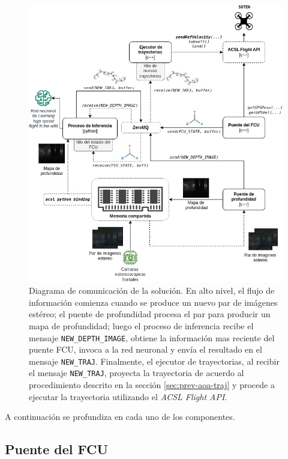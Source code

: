 \begin{figure}[H]
    \centering
    \includegraphics[scale=0.5]{partes/img/Solution-V3-Spanish.jpg}
    \caption[Diagrama de comunicación de la solución.]{Diagrama de comunicación de la solución. En alto nivel, el flujo de información comienza cuando se produce un nuevo par de imágenes estéreo; el puente de profundidad procesa el par para producir un mapa de profundidad; luego el proceso de inferencia recibe el mensaje \texttt{NEW\_DEPTH\_IMAGE}, obtiene la información mas reciente del puente FCU, invoca a la red neuronal y envía el resultado en el mensaje \texttt{NEW\_TRAJ}. Finalmente, el ejecutor de trayectorias, al recibir el mensaje \texttt{NEW\_TRAJ}, proyecta la trayectoria de acuerdo al procedimiento descrito en la sección \ref{sec:prev-aoa-traj} y procede a ejecutar la trayectoria utilizando el \textit{ACSL Flight API}.}
    \label{fig:sol-comm}
\end{figure}

A continuación se profundiza en cada uno de los componentes.

\subsection{Puente del FCU}

